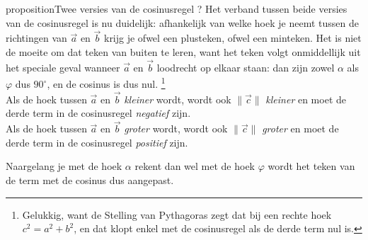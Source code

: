 \documentclass{ximera}
\begin{document}
\begin{expandable}{proposition}{Twee versies van de cosinusregel ?}
    Het verband tussen beide versies van de cosinusregel is nu duidelijk: afhankelijk van welke hoek je neemt tussen de richtingen van $\vec{a}$ en $\vec{b}$ krijg je ofwel een plusteken, ofwel een minteken.
    Het is niet de moeite om dat teken van buiten te leren, want het teken volgt onmiddellijk uit het speciale geval wanneer $\vec{a}$ en $\vec{b}$ loodrecht op elkaar staan: dan zijn zowel $\alpha$ als $\varphi$ dus $90^\circ$, en de cosinus is dus nul.%
    \footnote{Gelukkig, want de Stelling van Pythagoras zegt dat bij een rechte hoek $c^2 = a^2 + b^2$, en dat klopt enkel met de cosinusregel als de derde term nul is. }
    \\
    Als de hoek tussen $\vec{a}$ en $\vec{b}$ \textit{kleiner} wordt, wordt ook $\|\vec{c}\|$ \textit{kleiner} en moet de derde term in de cosinusregel \textit{negatief} zijn.\\
    Als de hoek tussen $\vec{a}$ en $\vec{b}$ \textit{groter } wordt, wordt ook $\|\vec{c}\|$ \textit{groter } en moet de derde term in de cosinusregel \textit{positief} zijn.

    Naargelang je met de hoek $\alpha$ rekent dan wel met de hoek $\varphi$ wordt het teken van de term met de cosinus dus aangepast.



\end{expandable}
\end{document}

